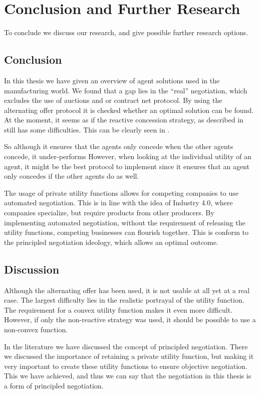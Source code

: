 \chapter{Conclusion and Further Research}
To conclude we discuss our research, and give possible further research options.
\section{Conclusion}
In this thesis we have given an overview of agent solutions used in the manufacturing world. We found that a gap lies in the ``real'' negotiation, which excludes the use of auctions and or contract net protocol. By using the alternating offer protocol it is checked whether an optimal solution can be found. At the moment, it seems as if the reactive concession strategy, as described in \citet{zheng2015automated} still has some difficulties. This can be clearly seen in . 

So although it ensures that the agents only concede when the other agents concede, it under-performs However, when looking at the individual utility of an agent, it might be the best protocol to implement since it ensures that an agent only concedes if the other agents do as well.

The usage of private utility functions allows for competing companies to use automated negotiation. This is in line with the idea of Industry 4.0, where companies specialize, but require products from other producers. By implementing automated negotiation, without the requirement of releasing the utility functions, competing businesses can flourish together. This is conform to the principled negotiation ideology, which allows an optimal outcome.

\section{Discussion}
Although the alternating offer has been used, it is not usable at all yet at a real case. The largest difficulty lies in the realistic portrayal of the utility function. The requirement for a convex utility function makes it even more difficult. However, if only the non-reactive strategy was used, it should be possible to use a non-convex function.

In the literature we have discussed the concept of principled negotiation. There we discussed the importance of retaining a private utility function, but making it very important to create these utility functions to ensure objective negotiation. This we have achieved, and thus we can say that the negotiation in this thesis is a form of principled negotiation.

